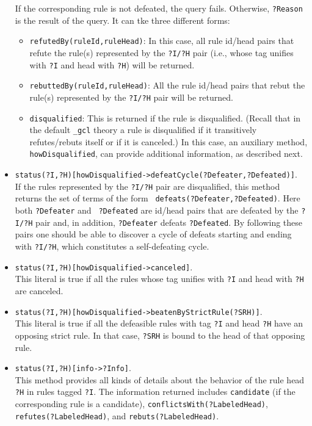 \documentclass[11pt]{article}
\begin{document}
\begin{itemize}
  If the corresponding rule is not defeated, the query fails.  Otherwise,
  {\tt ?Reason} is the result of the query. It can tke three different forms:
  \begin{itemize}
  \item {\tt refutedBy(ruleId,ruleHead)}: In this case, all rule
    id/head pairs that refute the rule(s) represented by the {\tt ?I/?H}
    pair (i.e., whose tag unifies with {\tt ?I} and head with {\tt ?H})
    will be returned.
  \item {\tt rebuttedBy(ruleId,ruleHead)}: All the rule
    id/head pairs that rebut the rule(s) represented by the {\tt ?I/?H} pair
    will be returned.
  \item {\tt disqualified}: This is returned if the rule is
    disqualified. (Recall that in the default {\tt \_gcl} theory a rule is
    disqualified if it transitively refutes/rebuts itself or if it is
    canceled.)
    In this case, an auxiliary method, {\tt howDisqualified}, can provide
    additional information, as described next. 
  \end{itemize}
\item  {\tt status(?I,?H)[howDisqualified->defeatCycle(?Defeater,?Defeated)]}.\\
  If the rules represented by the {\tt ?I/?H} pair are disqualified, this
  method returns the set of terms of the form {\tt
    defeats(?Defeater,?Defeated)}. Here both {\tt ?Defeater} and {\tt
    ?Defeated} are id/head pairs that are defeated by the {\tt ?I/?H} pair
  and, in addition, {\tt ?Defeater} defeats {\tt ?Defeated}. By following
  these pairs one should be able
  to discover a cycle of defeats starting and ending
  with {\tt ?I/?H}, which constitutes a self-defeating cycle.
\item  {\tt status(?I,?H)[howDisqualified->canceled]}.\\
  This literal is true if all the rules whose tag unifies with
  {\tt ?I} and head with {\tt ?H} are
  canceled.
\item  {\tt status(?I,?H)[howDisqualified->beatenByStrictRule(?SRH)]}.\\
  This literal is true if all the defeasible rules with tag \texttt{?I}
  and head \texttt{?H} have an opposing strict rule. In that case,
  \texttt{?SRH} is bound to the head of that opposing rule. 
\item  {\tt status(?I,?H)[info->?Info]}.\\
  This method provides all kinds of details about the behavior of the rule
  head {\tt ?H} in rules tagged {\tt ?I}. The information returned
  includes {\tt candidate} (if the corresponding rule is a candidate),
  {\tt conflictsWith(?LabeledHead)}, {\tt refutes(?LabeledHead)}, and
  {\tt rebuts(?LabeledHead)}.   
\end{itemize}
\end{document}
